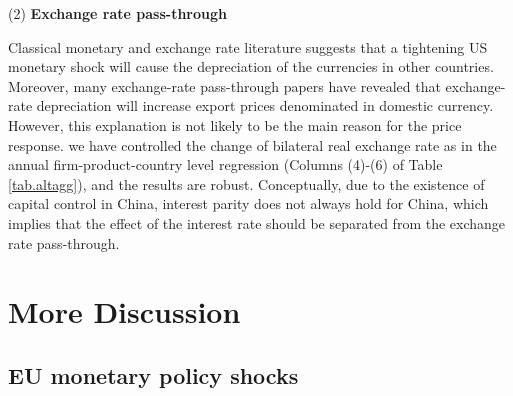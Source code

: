 (2) \textbf{Exchange rate pass-through} 

Classical monetary and exchange rate literature suggests that a tightening US monetary shock will cause the depreciation of the currencies in other countries. Moreover, many exchange-rate pass-through papers have revealed that exchange-rate depreciation will increase export prices denominated in domestic currency. However, this explanation is not likely to be the main reason for the price response. we have controlled the change of bilateral real exchange rate as in the annual firm-product-country level regression (Columns (4)-(6) of Table \ref{tab.altagg}), and the results are robust. Conceptually, due to the existence of capital control in China, interest parity does not always hold for China, which implies that the effect of the interest rate should be separated from the exchange rate pass-through.

\newpage
\section{More Discussion}

\subsection{EU monetary policy shocks}

